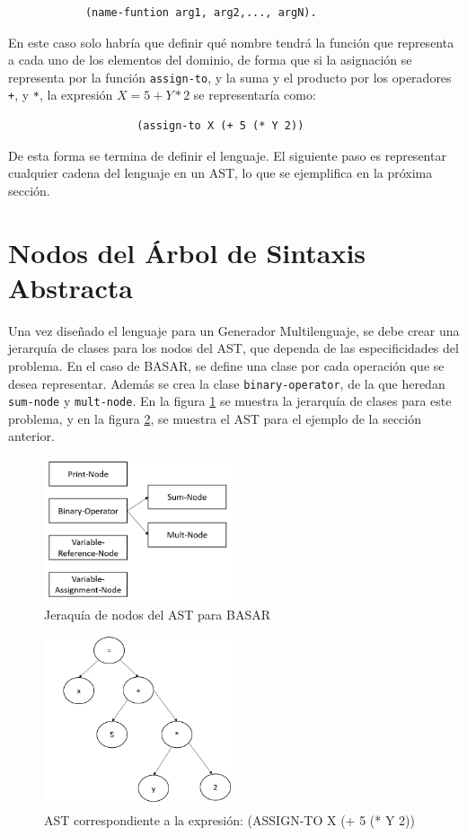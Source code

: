 \begin{verbatim}
            (name-funtion arg1, arg2,..., argN).
\end{verbatim}
En este caso solo habría que definir qué nombre tendrá la función que representa a cada uno de los elementos del dominio, de forma que si la asignación se representa por la función \texttt{assign-to}, y la suma y el producto por los operadores \texttt{+}, y \texttt{*}, la expresión $X = 5 + Y * 2$ se representaría como:

\begin{verbatim}
                    (assign-to X (+ 5 (* Y 2))
\end{verbatim}
De esta forma se termina de definir el lenguaje. El siguiente paso es representar cualquier cadena del lenguaje en un AST, lo que se ejemplifica en la próxima sección.

\section{Nodos del Árbol de Sintaxis Abstracta}

Una vez diseñado el lenguaje para un Generador Multilenguaje, se debe crear una jerarquía de clases para los nodos del AST, que dependa de las especificidades del problema. En el caso de BASAR, se define  una clase por cada operación que se desea representar. Además se crea la clase \texttt{binary-operator}, de la que heredan \texttt{sum-node} y \texttt{mult-node}. En la figura \ref{nodos-para-Basar} se muestra la jerarquía de clases para este problema, y en la figura \ref{AST3}, se muestra el AST para el ejemplo de la sección anterior.
\begin{figure}
    \centering
    \includegraphics[width=0.5\textwidth]{simple-jerarquia.png}
    \caption{Jeraquía de nodos del AST para BASAR}
    \label{nodos-para-Basar}
\end{figure}
\begin{figure}
    \centering
    \includegraphics[width=0.5\textwidth]{AST3.png}
    \caption{AST correspondiente a la expresión: (ASSIGN-TO X (+ 5 (* Y 2))}
    \label{AST3}
  \end{figure}

